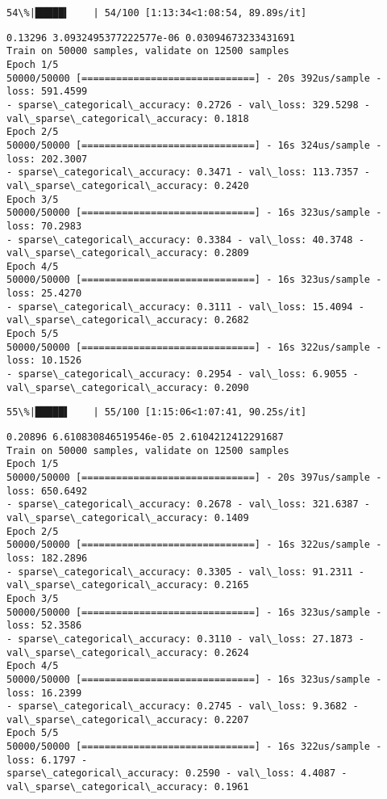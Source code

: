 \documentclass[11pt]{article}
\begin{document}
    \begin{Verbatim}[commandchars=\\\{\}]
 54\%|█████▍    | 54/100 [1:13:34<1:08:54, 89.89s/it]
    \end{Verbatim}

    \begin{Verbatim}[commandchars=\\\{\}]
0.13296 3.0932495377222577e-06 0.03094673233431691
Train on 50000 samples, validate on 12500 samples
Epoch 1/5
50000/50000 [==============================] - 20s 392us/sample - loss: 591.4599
- sparse\_categorical\_accuracy: 0.2726 - val\_loss: 329.5298 -
val\_sparse\_categorical\_accuracy: 0.1818
Epoch 2/5
50000/50000 [==============================] - 16s 324us/sample - loss: 202.3007
- sparse\_categorical\_accuracy: 0.3471 - val\_loss: 113.7357 -
val\_sparse\_categorical\_accuracy: 0.2420
Epoch 3/5
50000/50000 [==============================] - 16s 323us/sample - loss: 70.2983
- sparse\_categorical\_accuracy: 0.3384 - val\_loss: 40.3748 -
val\_sparse\_categorical\_accuracy: 0.2809
Epoch 4/5
50000/50000 [==============================] - 16s 323us/sample - loss: 25.4270
- sparse\_categorical\_accuracy: 0.3111 - val\_loss: 15.4094 -
val\_sparse\_categorical\_accuracy: 0.2682
Epoch 5/5
50000/50000 [==============================] - 16s 322us/sample - loss: 10.1526
- sparse\_categorical\_accuracy: 0.2954 - val\_loss: 6.9055 -
val\_sparse\_categorical\_accuracy: 0.2090
    \end{Verbatim}

    \begin{Verbatim}[commandchars=\\\{\}]
 55\%|█████▌    | 55/100 [1:15:06<1:07:41, 90.25s/it]
    \end{Verbatim}

    \begin{Verbatim}[commandchars=\\\{\}]
0.20896 6.610830846519546e-05 2.6104212412291687
Train on 50000 samples, validate on 12500 samples
Epoch 1/5
50000/50000 [==============================] - 20s 397us/sample - loss: 650.6492
- sparse\_categorical\_accuracy: 0.2678 - val\_loss: 321.6387 -
val\_sparse\_categorical\_accuracy: 0.1409
Epoch 2/5
50000/50000 [==============================] - 16s 322us/sample - loss: 182.2896
- sparse\_categorical\_accuracy: 0.3305 - val\_loss: 91.2311 -
val\_sparse\_categorical\_accuracy: 0.2165
Epoch 3/5
50000/50000 [==============================] - 16s 323us/sample - loss: 52.3586
- sparse\_categorical\_accuracy: 0.3110 - val\_loss: 27.1873 -
val\_sparse\_categorical\_accuracy: 0.2624
Epoch 4/5
50000/50000 [==============================] - 16s 323us/sample - loss: 16.2399
- sparse\_categorical\_accuracy: 0.2745 - val\_loss: 9.3682 -
val\_sparse\_categorical\_accuracy: 0.2207
Epoch 5/5
50000/50000 [==============================] - 16s 322us/sample - loss: 6.1797 -
sparse\_categorical\_accuracy: 0.2590 - val\_loss: 4.4087 -
val\_sparse\_categorical\_accuracy: 0.1961
    \end{Verbatim}
\end{document}
